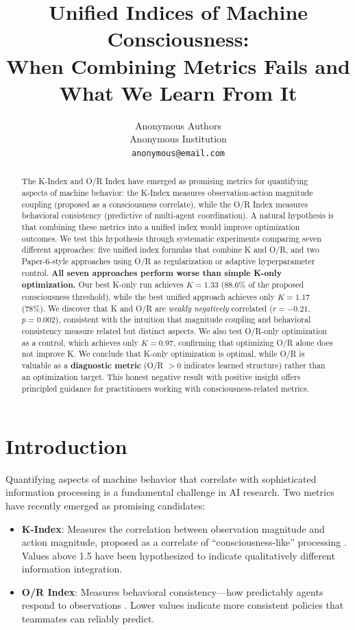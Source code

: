 \documentclass[twoside]{article}
\title{Unified Indices of Machine Consciousness:\\When Combining Metrics Fails and What We Learn From It}
\author{
  Anonymous Authors\\
  Anonymous Institution\\
  \texttt{anonymous@email.com}
}
\date{}
\theoremstyle{remark}
\begin{document}
\maketitle

\begin{abstract}
The K-Index and O/R Index have emerged as promising metrics for quantifying
aspects of machine behavior: the K-Index measures observation-action magnitude
coupling (proposed as a consciousness correlate), while the O/R Index measures
behavioral consistency (predictive of multi-agent coordination). A natural
hypothesis is that combining these metrics into a unified index would improve
optimization outcomes. We test this hypothesis through systematic experiments
comparing seven different approaches: five unified index formulas that combine
K and O/R, and two Paper-6-style approaches using O/R as regularization or
adaptive hyperparameter control. \textbf{All seven approaches perform worse than
simple K-only optimization.} Our best K-only run achieves $K = 1.33$ (88.6\% of
the proposed consciousness threshold), while the best unified approach achieves
only $K = 1.17$ (78\%). We discover that K and O/R are
\emph{weakly negatively} correlated ($r = -0.21$, $p = 0.002$), consistent with
the intuition that magnitude coupling and behavioral consistency measure related
but distinct aspects. We also test O/R-only optimization as a control, which achieves
only $K = 0.97$, confirming that optimizing O/R alone does not improve K. We conclude
that K-only optimization is optimal, while O/R is valuable as a
\textbf{diagnostic metric} (O/R $> 0$ indicates learned structure)
rather than an optimization target. This honest negative result with positive
insight offers principled guidance for practitioners working with consciousness-related metrics.
\end{abstract}

\section{Introduction}

Quantifying aspects of machine behavior that correlate with sophisticated
information processing is a fundamental challenge in AI research. Two metrics
have recently emerged as promising candidates:

\begin{itemize}
    \item \textbf{K-Index}: Measures the correlation between observation magnitude
    and action magnitude, proposed as a correlate of ``consciousness-like''
    processing \citep{kosmic2025}. Values above 1.5 have been hypothesized to
    indicate qualitatively different information integration.

    \item \textbf{O/R Index}: Measures behavioral consistency---how predictably
    agents respond to observations \citep{or2025}. Lower values indicate more
    consistent policies that teammates can reliably predict.
\end{itemize}
\end{document}

